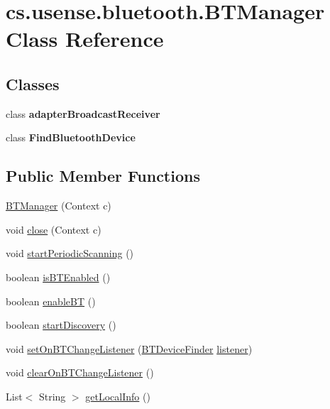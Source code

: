\hypertarget{classcs_1_1usense_1_1bluetooth_1_1_b_t_manager}{}\section{cs.\+usense.\+bluetooth.\+B\+T\+Manager Class Reference}
\label{classcs_1_1usense_1_1bluetooth_1_1_b_t_manager}
\subsection*{Classes}
\begin{DoxyCompactItemize}
\item 
class {\bfseries adapter\+Broadcast\+Receiver}
\item 
class {\bfseries Find\+Bluetooth\+Device}
\end{DoxyCompactItemize}
\subsection*{Public Member Functions}
\begin{DoxyCompactItemize}
\item 
\hyperlink{classcs_1_1usense_1_1bluetooth_1_1_b_t_manager_af895e31c32ccd84b460196192d2a14eb}{B\+T\+Manager} (Context c)
\item 
void \hyperlink{classcs_1_1usense_1_1bluetooth_1_1_b_t_manager_a8afc2effffd2aedb21a324c3b238861a}{close} (Context c)
\item 
void \hyperlink{classcs_1_1usense_1_1bluetooth_1_1_b_t_manager_adb39d12e1183bcb07676123c59d5b085}{start\+Periodic\+Scanning} ()
\item 
boolean \hyperlink{classcs_1_1usense_1_1bluetooth_1_1_b_t_manager_ae7dbf04ed9779907a153dde734da6086}{is\+B\+T\+Enabled} ()
\item 
boolean \hyperlink{classcs_1_1usense_1_1bluetooth_1_1_b_t_manager_ae1f12992264846080805558d2cd69120}{enable\+B\+T} ()
\item 
boolean \hyperlink{classcs_1_1usense_1_1bluetooth_1_1_b_t_manager_aa8e2b14cdca7d30dd853b8540e3a011c}{start\+Discovery} ()
\item 
void \hyperlink{classcs_1_1usense_1_1bluetooth_1_1_b_t_manager_a7589599079a1761477e044daa97008af}{set\+On\+B\+T\+Change\+Listener} (\hyperlink{interfacecs_1_1usense_1_1bluetooth_1_1_b_t_device_finder}{B\+T\+Device\+Finder} \hyperlink{classcs_1_1usense_1_1bluetooth_1_1_b_t_manager_a7210126f7a9be3ab7bc154a0526c18ad}{listener})
\item 
void \hyperlink{classcs_1_1usense_1_1bluetooth_1_1_b_t_manager_a2eb24bf47a6174389c8805b2e1907d39}{clear\+On\+B\+T\+Change\+Listener} ()
\item 
List$<$ String $>$ \hyperlink{classcs_1_1usense_1_1bluetooth_1_1_b_t_manager_ae2e0b0bbc2ec9ffd6cdb45d6d8da8f8c}{get\+Local\+Info} ()
\end{DoxyCompactItemize}
